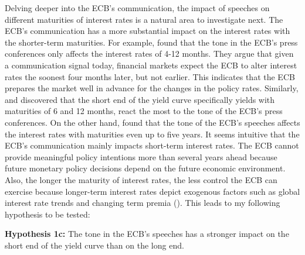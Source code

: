 Delving deeper into the ECB’s communication, the impact of speeches on different maturities of interest rates is a natural area to investigate next. The ECB’s communication has a more substantial impact on the interest rates with the shorter-term maturities. For example, \textcite{lamla2011} found that the tone in the ECB’s press conferences only affects the interest rates of 4-12 months. They argue that given a communication signal today, financial markets expect the ECB to alter interest rates the soonest four months later, but not earlier. This indicates that the ECB prepares the market well in advance for the changes in the policy rates. Similarly, \textcite{musard-gies2006} and \textcite{rosa2007} discovered that the short end of the yield curve specifically yields with maturities of 6 and 12 months, react the most to the tone of the ECB’s press conferences. On the other hand, \textcite{ehrmann2007} found that the tone of the ECB’s speeches affects the interest rates with maturities even up to five years. It seems intuitive that the ECB’s communication mainly impacts short-term interest rates. The ECB cannot provide meaningful policy intentions more than several years ahead because future monetary policy decisions depend on the future economic environment. Also, the longer the maturity of interest rates, the less control the ECB can exercise because longer-term interest rates depict exogenous factors such as global interest rate trends and changing term premia (\cite{lucca2009}). This leads to my following hypothesis to be tested:


\textbf{Hypothesis 1c:} The tone in the ECB’s speeches has a stronger impact on the short end of the yield curve than on the long end.


